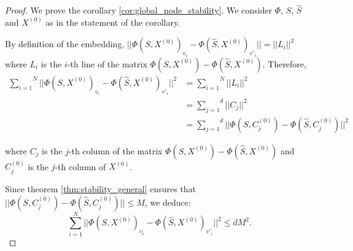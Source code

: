 \documentclass[11pt,a4paper]{article}
\newcommand{\Sum}[2]{\overset{#2}{\underset{#1}{\sum}}}
\theoremstyle{definition}
\renewcommand{\leq}{\leqslant}
\begin{document}
        \begin{proof}
            We prove the corollary \ref{cor:global_node_stability}. We consider $\Phi$, $S$, $\hat{S}$ and $X^{(0)}$ as in the statement of the corollary.

            By definition of the embedding, $|| \Phi(S, X^{(0)})_{v_i} - \Phi(\hat{S}, X ^{(0)})_{v'_i} || = || L_i || ^2$ where $L_i$ is the $i$-th line of the matrix $\Phi(S,X^{(0)}) - \Phi(\hat{S},X^{(0)})$. Therefore, 
            \begin{align*}
                \Sum{i=1}{N} || \Phi(S, X^{(0)})_{v_i} - \Phi(\hat{S}, X ^{(0)})_{v'_i} ||^2 &= \Sum{i=1}{N} || L_i ||^2 \\
                &= \Sum{j=1}{d} || C_j ||^2 \\
                &= \Sum{j=1}{d} || \Phi(S,C^{(0)}_j) - \Phi(\hat{S},C^{(0)}_j) ||^2 
            \end{align*}

            where $C_j$ is the $j$-th column of the matrix $\Phi(S,X^{(0)}) - \Phi(\hat{S},X^{(0)})$ and $C^{(0)}_j$ is the $j$-th column of $X^{(0)}$.

            Since theorem \ref{thm:stability_general} ensures that $ || \Phi(S,C^{(0)}_j) - \Phi(\hat{S},C^{(0)}_j) || \leq M $, we deduce:
            $$ \Sum{i=1}{N} || \Phi(S, X^{(0)})_{v_i} - \Phi(\hat{S}, X ^{(0)})_{v'_i} ||^2 \leq d M^2. $$

        \end{proof}



\end{document}
